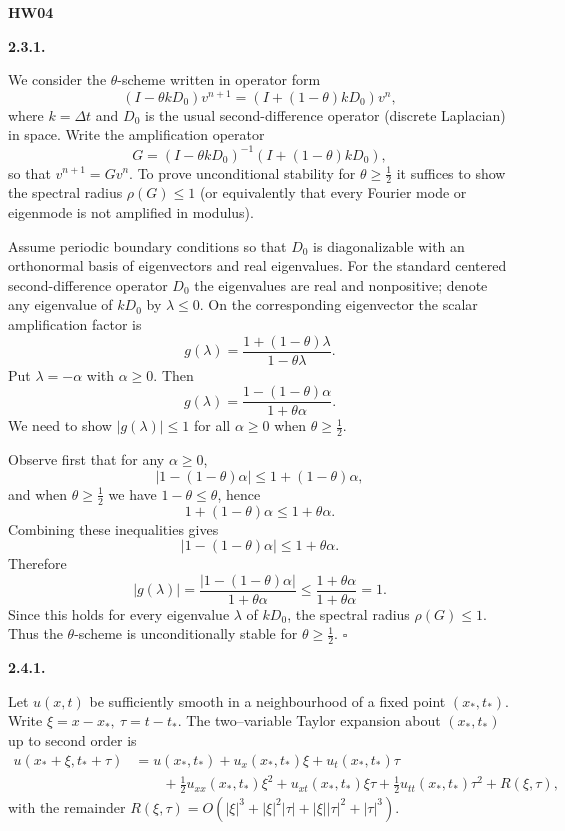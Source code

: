 \documentclass[11pt]{article}
\begin{document}
\noindent \textbf{HW04}

\vspace{1em}

\noindent\textbf{2.3.1.}

We consider the $\theta$-scheme written in operator form
\[
(I-\theta k D_0)v^{n+1}=(I+(1-\theta)kD_0)v^n,
\]
where $k=\Delta t$ and $D_0$ is the usual second-difference operator (discrete Laplacian) in space. Write the amplification operator
\[
G=(I-\theta k D_0)^{-1}(I+(1-\theta)kD_0),
\]
so that $v^{n+1}=G v^n$. To prove unconditional stability for $\theta\ge\frac12$ it suffices to show the spectral radius $\rho(G)\le1$ (or equivalently that every Fourier mode or eigenmode is not amplified in modulus).

Assume periodic boundary conditions so that $D_0$ is diagonalizable with an orthonormal basis of eigenvectors and real eigenvalues. For the standard centered second-difference operator $D_0$ the eigenvalues are real and nonpositive; denote any eigenvalue of $kD_0$ by $\lambda\le0$. On the corresponding eigenvector the scalar amplification factor is
\[
g(\lambda)=\frac{1+(1-\theta)\lambda}{1-\theta\lambda}.
\]
Put $\lambda=-\alpha$ with $\alpha\ge0$. Then
\[
g(\lambda)=\frac{1-(1-\theta)\alpha}{1+\theta\alpha}.
\]
We need to show $|g(\lambda)|\le1$ for all $\alpha\ge0$ when $\theta\ge\frac12$.

Observe first that for any $\alpha\ge0$,
\[
|1-(1-\theta)\alpha|\le 1+(1-\theta)\alpha,
\]
and when $\theta\ge\frac12$ we have $1-\theta\le\theta$, hence
\[
1+(1-\theta)\alpha \le 1+\theta\alpha.
\]
Combining these inequalities gives
\[
|1-(1-\theta)\alpha| \le 1+\theta\alpha.
\]
Therefore
\[
|g(\lambda)|=\frac{|1-(1-\theta)\alpha|}{1+\theta\alpha}\le \frac{1+\theta\alpha}{1+\theta\alpha}=1.
\]
Since this holds for every eigenvalue $\lambda$ of $kD_0$, the spectral radius $\rho(G)\le1$. Thus the $\theta$-scheme is unconditionally stable for $\theta\ge\frac12$. \(\square\)

\vspace{1em}

\noindent\textbf{2.4.1.}

Let \(u(x,t)\) be sufficiently smooth in a neighbourhood of a fixed point \((x_*,t_*)\).
Write \(\xi=x-x_*,\ \tau=t-t_*\). The two–variable Taylor expansion about \((x_*,t_*)\) up to second order is
\[
\begin{aligned}
u(x_*+\xi,t_*+\tau)
&= u(x_*,t_*) + u_x(x_*,t_*)\xi + u_t(x_*,t_*)\tau \\
&\qquad + \tfrac12 u_{xx}(x_*,t_*)\xi^2 + u_{xt}(x_*,t_*)\xi\tau + \tfrac12 u_{tt}(x_*,t_*)\tau^2
+ R(\xi,\tau),
\end{aligned}
\]
with the remainder \(R(\xi,\tau)=O(|\xi|^3+|\xi|^2|\tau|+|\xi||\tau|^2+|\tau|^3)\).
\end{document}
